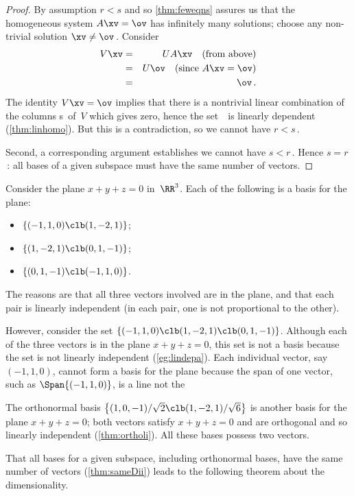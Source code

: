 \begin{proof}
By assumption \(r<s\) and so \cref{thm:feweqns} assures us that the homogeneous system \(A\xv=\ov\) has infinitely many solutions; choose any non-trivial solution \(\xv\neq\ov\)\,.
Consider 
\begin{eqnarray*}
V\xv&=& UA\xv\quad(\text{from above})
\\&=&U\ov\quad(\text{since }A\xv=\ov)
\\&=&\ov\,.
\end{eqnarray*}
The identity \(V\xv=\ov\) implies that there is a nontrivial linear combination of the columns \hlist\vv s\ of~\(V\) which gives zero, hence the set~\cV\ is linearly dependent (\cref{thm:linhomo}).  
But this is a contradiction, so we cannot have \(r<s\)\,.

Second, a corresponding argument establishes we cannot have \(s<r\)\,.
Hence \(s=r\)\,: all bases of a given subspace must have the same number of vectors.
\end{proof}



\begin{example} \label{eg:samedi}
Consider the plane \(x+y+z=0\) in~\(\RR^3\).
Each of the following is a basis for the plane:
\begin{itemize}
\item \(\{(-1,1,0)\clb (1,-2,1)\}\);
\item \(\{(1,-2,1)\clb (0,1,-1)\}\); 
\item \(\{(0,1,-1)\clb (-1,1,0)\}\).
\end{itemize}
The reasons are that all three vectors involved are in the plane, and that each pair is linearly independent (in each pair, one is not proportional to the other).

However, consider the set \(\{(-1,1,0)\clb (1,-2,1)\clb (0,1,-1)\}\).
Although each of the three vectors is in the plane \(x+y+z=0\), this set is not a basis because the set is not linearly independent (\cref{eg:lindepa}).
Each individual vector, say \((-1,1,0)\), cannot form a basis for the plane because the span of one vector, such as \(\Span\{(-1,1,0)\}\), is a line not the 

The orthonormal basis \(\big\{(1,0,-1)/\sqrt2\clb (1,-2,1)/\sqrt6\big\}\) is another basis for the plane \(x+y+z=0\); both vectors satisfy \(x+y+z=0\) and are orthogonal and so linearly independent (\cref{thm:ortholi}).  
All these bases possess two vectors.
\end{example}

That all bases for a given subspace, including orthonormal bases, have the same number of vectors (\cref{thm:sameDii}) leads to the following theorem about the dimensionality.

